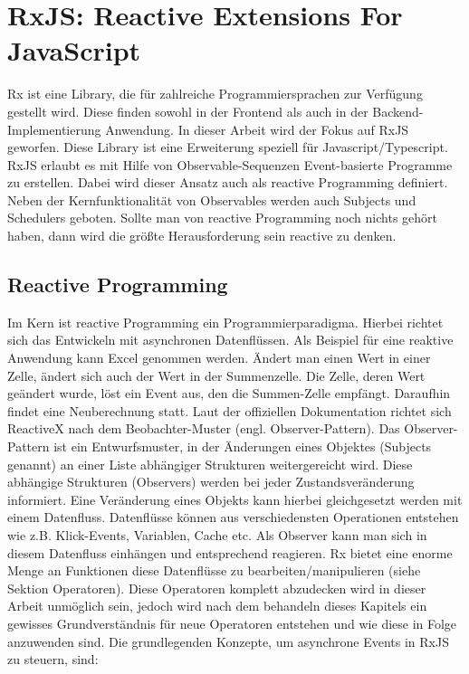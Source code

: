 \section{RxJS: Reactive Extensions For JavaScript}
Rx ist eine Library, die für zahlreiche Programmiersprachen zur Verfügung gestellt wird. Diese finden sowohl in der Frontend als auch in der Backend-Implementierung Anwendung. In dieser Arbeit wird der Fokus auf RxJS geworfen. Diese Library ist eine Erweiterung speziell für Javascript/Typescript. RxJS erlaubt es mit Hilfe von Observable-Sequenzen Event-basierte Programme zu erstellen. Dabei wird dieser Ansatz auch als reactive Programming definiert. Neben der Kernfunktionalität von Observables werden auch Subjects und Schedulers geboten. Sollte man von reactive Programming noch nichts gehört haben, dann wird die größte Herausforderung sein \glqq{}reactive\grqq{} zu denken.

\subsection{Reactive Programming}
Im Kern ist reactive Programming ein Programmierparadigma. Hierbei richtet sich das Entwickeln mit asynchronen Datenflüssen. Als Beispiel für eine reaktive Anwendung kann Excel genommen werden. Ändert man einen Wert in einer Zelle, ändert sich auch der Wert in der Summenzelle. Die Zelle, deren Wert geändert wurde, löst ein Event aus, den die Summen-Zelle empfängt. Daraufhin findet eine Neuberechnung statt.\cite{reactive-programming-beispiel} Laut der offiziellen Dokumentation richtet sich ReactiveX nach dem Beobachter-Muster (engl. Observer-Pattern). Das Observer-Pattern ist ein Entwurfsmuster, in der Änderungen eines Objektes (Subjects genannt) an einer Liste abhängiger Strukturen weitergereicht wird. Diese abhängige Strukturen (Observers) werden bei jeder Zustandsveränderung informiert. Eine Veränderung eines Objekts kann hierbei gleichgesetzt werden mit einem Datenfluss. Datenflüsse können aus verschiedensten Operationen entstehen wie z.B. Klick-Events, Variablen, Cache etc. Als Observer kann man sich in diesem Datenfluss einhängen und entsprechend reagieren.\cite{rx-intro} Rx bietet eine enorme Menge an Funktionen diese Datenflüsse zu bearbeiten/manipulieren (siehe Sektion Operatoren). Diese Operatoren komplett abzudecken wird in dieser Arbeit unmöglich sein, jedoch wird nach dem behandeln dieses Kapitels ein gewisses Grundverständnis für neue Operatoren entstehen und wie diese in Folge anzuwenden sind. Die grundlegenden Konzepte, um asynchrone Events in RxJS zu steuern, sind:

